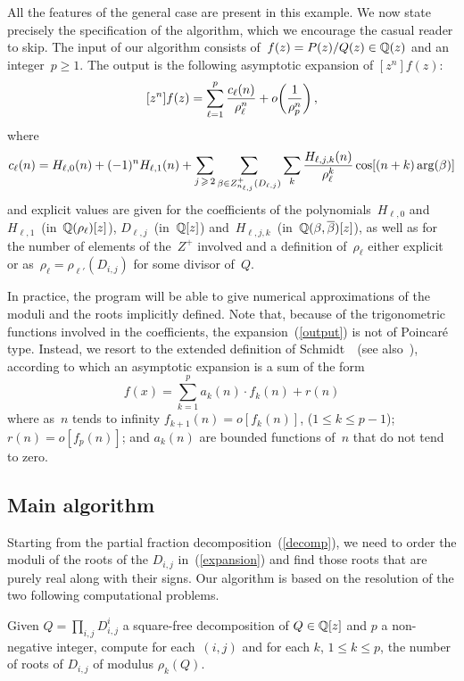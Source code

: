 All the features of the general case are present in this example. We
now state precisely the specification of the algorithm, which we encourage
the casual reader to skip. The input of our algorithm consists
of~$f(z)=P(z)/Q(z)\in\Q(z)$ and an 
integer~$p\geq1$.
The output is the following asymptotic expansion
of $[z^n]f(z)$: 
\begin{equation}\label{output}
[z^n]f(z) = \sum_{\ell=1}^p {c_\ell(n)\over\rho_\ell^n}+
o\!\left({1\over\rho_p^n}\right),
\end{equation}
where
\[
c_\ell(n)=H_{\ell,0}(n) + (-1)^n H_{\ell,1}(n) +
\sum_{j\geq 2} 
\sum_{\beta\in Z_{n_{\ell,j}}^+(D_{\ell,j})}
\sum_k{H_{\ell,j,k}(n)\over\rho_\ell^k}
\cos[(n+k)\arg (\beta)]
\]
and explicit values are given for the coefficients of the
polynomials~$H_{\ell,0}$ and~$H_{\ell,1}$~(in~$\Q(\rho_\ell)[z]$),
$D_{\ell,j}$~(in~$\Q[z]$)
and~$H_{\ell,j,k}$~(in~$\Q(\beta,\overline{\beta})[z]$), as well
as for the number of elements of the~$Z^+$ involved and a definition
of~$\rho_\ell$ either explicit or
as~$\rho_{\ell}=\rho_{\ell'}(D_{i,j})$ for some divisor of~$Q$.

In practice, the program will be able to give numerical
approximations of the moduli and the roots implicitly defined.
Note that, because of the trigonometric functions involved in the
coefficients, the expansion~(\ref{output}) is not of Poincar\'e type.
Instead, we resort to the extended definition of
Schmidt~\cite{Schmidt36}~(see also~\cite{Dieudonne68}), according to
which an
asymptotic expansion is a sum of the form
\begin{equation}\label{asympt}
f(x)=\sum_{k=1}^p a_k(n) \cdot  f_k(n) + r(n)
\end{equation}
where as~$n$ tends to infinity $f_{k+1}(n)=o\left[f_k(n)\right]$,
($1\le k\le p-1$); $r(n)=o\left[f_p(n)\right]$; and $a_k(n)$ are bounded
functions of~$n$ that do not tend to 
zero.


\subsection{Main algorithm}
Starting from the partial fraction decomposition~(\ref{decomp}),
we need to order
the moduli of the roots of the $D_{i,j}$ in~(\ref{expansion}) and
find those roots that are purely real along with their signs. 
Our algorithm is based on the resolution of the two following
computational problems. 
\begin{task} 
Given $Q=\prod_{i,j} D_{i,j}^i$ a square-free decomposition of $Q \in
\Q[z]$ and $p$ a non-negative integer, compute for each~$(i,j)$ and for each $k$, $1 \leq k \leq
p$, the number of roots of $D_{i,j}$ of modulus $\rho_k(Q)$.
\end{task}

